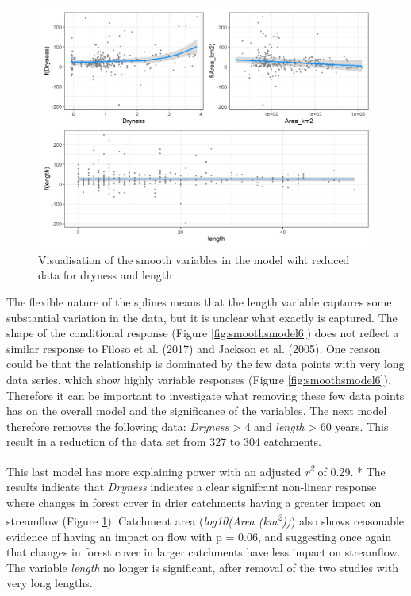 \documentclass[]{elsarticle} %
\begin{document}
\begin{figure}
\includegraphics[width=0.9\linewidth]{model7_smooths} \caption{Visualisation of the smooth variables in the model wiht reduced data for dryness and length}\label{fig:smoothsmodel7}
\end{figure}

The flexible nature of the splines means that the length variable captures some substantial variation in the data, but it is unclear what exactly is captured. The shape of the conditional response (Figure \ref{fig:smoothsmodel6}) does not reflect a similar response to Filoso et al. (2017) and Jackson et al. (2005). One reason could be that the relationship is dominated by the few data points with very long data series, which show highly variable responses (Figure \ref{fig:smoothsmodel6}). Therefore it can be important to investigate what removing these few data points has on the overall model and the significance of the variables. The next model therefore removes the following data: \emph{Dryness} \textgreater{} 4 and \emph{length} \textgreater{} 60 years. This result in a reduction of the data set from 327 to 304 catchments.

This last model has more explaining power with an adjusted \emph{r\textsuperscript{2}} of 0.29. * The results indicate that \emph{Dryness} indicates a clear signifcant non-linear response where changes in forest cover in drier catchments having a greater impact on streamflow (Figure \ref{fig:smoothsmodel7}). Catchment area (\emph{log10(Area (km\textsuperscript{2}))}) also shows reasonable evidence of having an impact on flow with p = 0.06, and suggesting once again that changes in forest cover in larger catchments have less impact on streamflow. The variable \emph{length} no longer is significant, after removal of the two studies with very long lengths.
\end{document}
